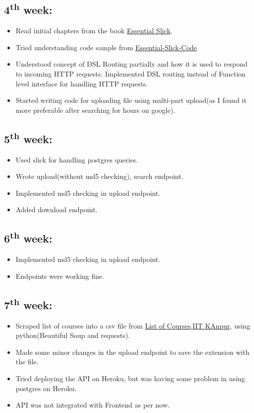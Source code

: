 \documentclass{article}
\begin{document}
\subsection*{4\textsuperscript{th} week:}
\begin{itemize}
    \item Read initial chapters from the book \href{http://underscore.io/books/essential-slick/}{Essential Slick}.
    \item Tried understanding code sample from \href{https://github.com/abhayptp/essential-slick-code}{Essential-Slick-Code}
    \item Understood concept of DSL Routing partially and how it is used to respond to incoming HTTP requests. Implemented DSL routing instead of Function level interface for handling HTTP requests. 
    \item Started writing code for uploading file using multi-part upload(as I found it more preferable after searching for hours on google).
    
\end{itemize}


\subsection*{5\textsuperscript{th} week:}
\begin{itemize}
    \item Used slick for handling postgres queries.
    \item Wrote upload(without md5 checking), search endpoint.
    \item Implemented md5 checking in upload endpoint.
    \item Added download endpoint.
\end{itemize}

\subsection*{6\textsuperscript{th} week:}
\begin{itemize}
    \item Implemented md5 checking in upload endpoint.
    \item Endpoints were working fine.
\end{itemize}


\subsection*{7\textsuperscript{th} week:}
\begin{itemize}
    \item Scraped list of courses into a csv file from \href{http://iitk.ac.in/new/index.php/uncategorised/1320-list-of-courses}{List of Courses,IIT KAnpur}, using python(Beautiful Soup and requests).
    \item Made some minor changes in the upload endpoint to save the extension with the file.
    \item Tried deploying the API on Heroku, but was having some problem in using postgres on Heroku.
    \item API was not integrated with Frontend as per now.

\end{itemize}
\end{document}
